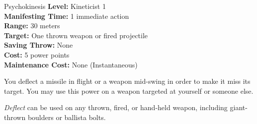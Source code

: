 {Psychokinesis}
{
	\textbf{Level:}
	Kineticist 1\\
	\textbf{Manifesting Time:}
	1 immediate action\\
	\textbf{Range:}
	30 meters\\
	\textbf{Target:}
	One thrown weapon or fired projectile\\
	\textbf{Saving Throw:}
	None\\
	\textbf{Cost:}
	5 power points\\
	\textbf{Maintenance Cost:}
	None (Instantaneous)\\
}
{
	You deflect a missile in flight or a weapon mid-swing in order to make it miss its target. You may use this power on a weapon targeted at yourself or someone else.

	\emph{Deflect} can be used on any thrown, fired, or hand-held weapon, including giant-thrown boulders or ballista bolts.
}